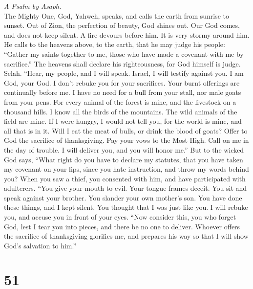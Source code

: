 \emph{A Psalm by Asaph.}\\
 The Mighty One, God, Yahweh, speaks, and calls the earth
from sunrise to sunset.  Out of Zion, the perfection of
beauty, God shines out.  Our God comes, and does not keep
silent. A fire devours before him. It is very stormy around him.
 He calls to the heavens above, to the earth, that he may
judge his people:  ``Gather my saints together to me,
those who have made a covenant with me by sacrifice.'' 
The heavens shall declare his righteousness, for God himself is judge.
Selah.  ``Hear, my people, and I will speak. Israel, I
will testify against you. I am God, your God.  I don't
rebuke you for your sacrifices. Your burnt offerings are continually
before me.  I have no need for a bull from your stall, nor
male goats from your pens.  For every animal of the
forest is mine, and the livestock on a thousand hills.  I
know all the birds of the mountains. The wild animals of the field are
mine.  If I were hungry, I would not tell you, for the
world is mine, and all that is in it.  Will I eat the
meat of bulls, or drink the blood of goats?  Offer to God
the sacrifice of thanksgiving. Pay your vows to the Most High.
 Call on me in the day of trouble. I will deliver you,
and you will honor me.''  But to the wicked God says,
``What right do you have to declare my statutes, that you have taken my
covenant on your lips,  since you hate instruction, and
throw my words behind you?  When you saw a thief, you
consented with him, and have participated with adulterers.
 ``You give your mouth to evil. Your tongue frames
deceit.  You sit and speak against your brother. You
slander your own mother's son.  You have done these
things, and I kept silent. You thought that I was just like you. I will
rebuke you, and accuse you in front of your eyes.  ``Now
consider this, you who forget God, lest I tear you into pieces, and
there be no one to deliver.  Whoever offers the sacrifice
of thanksgiving glorifies me, and prepares his way so that I will show
God's salvation to him.''

\hypertarget{section-50}{%
\section{51}\label{section-50}}

